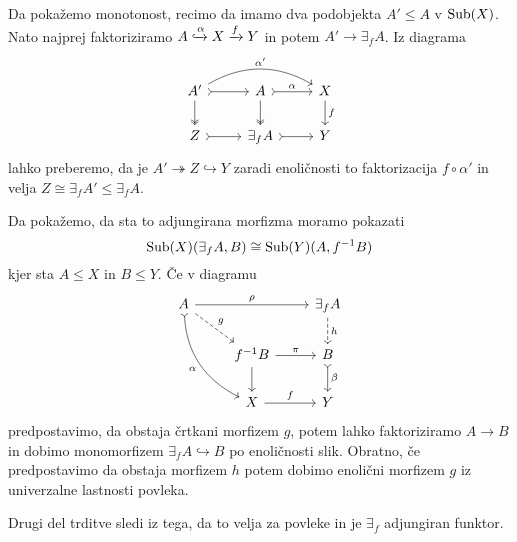 \documentclass[../kategoricna_logika.tex]{subfiles}
\begin{document}
\begin{dokaz}
  Da pokažemo monotonost, recimo da imamo dva podobjekta $A' \leq A$ v $\operatorname{Sub}(X)$.
  Nato najprej faktoriziramo $A \xhookrightarrow{\alpha} X \xrightarrow{f} Y$ in potem $A' \to \exists_f A$.
  Iz diagrama
  \begin{equation*}
  \begin{tikzcd}
    A' \ar[d, two heads] \ar[r, tail] \ar[rr, bend left, "\alpha'"] & A \ar[d, two heads] \ar[r, tail, "\alpha"] & X \ar[d, "f"] \\
    Z \ar[r, tail] & \exists_f A \ar[r, tail] & Y
  \end{tikzcd}
  \end{equation*}
  lahko preberemo, da je $A' \twoheadrightarrow Z \hookrightarrow Y$ zaradi enoličnosti to faktorizacija
  $f \circ \alpha'$ in velja $Z \cong \exists_f A' \leq \exists_f A$.

  Da pokažemo, da sta to adjungirana morfizma moramo pokazati 
  $$\operatorname{Sub}(X)(\exists_f A, B) \cong \operatorname{Sub}(Y)(A, f^{-1}B)$$
  kjer sta $A \leq X$ in $B \leq Y$. Če v diagramu
  \begin{equation*}
  \begin{tikzcd}
    A \ar[ddr, bend right, tail, "\alpha"'] \ar[dr, dashed, "g"] \ar[rr, "\rho"] & & \exists_f A \ar[d, dashed, "h"] \\
    & f^{-1}B \ar[d] \ar[r, "\pi"] & B \ar[d, tail, "\beta"] \\
    & X \ar[r, "f"] & Y
  \end{tikzcd}
  \end{equation*}
  predpostavimo, da obstaja črtkani morfizem $g$,
  potem lahko faktoriziramo $A \to B$ in dobimo monomorfizem $\exists_f A \hookrightarrow B$ po enoličnosti slik.
  Obratno, če predpostavimo da obstaja morfizem $h$ potem dobimo enolični morfizem $g$ iz univerzalne lastnosti povleka.

  Drugi del trditve sledi iz tega, da to velja za povleke in je $\exists_f$ adjungiran funktor.
\end{dokaz}
%
\end{document}
